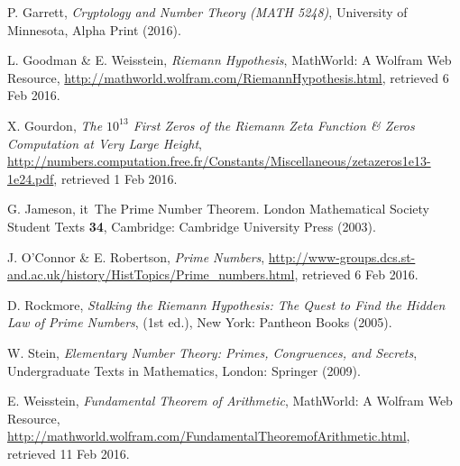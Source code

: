 \documentclass[11pt]{article}
\begin{document}
\medskip
\noindent
[Garrett 2016] P. Garrett, {\it Cryptology and Number Theory (MATH 5248)}, University of Minnesota, Alpha Print (2016).

\medskip
{} L. Goodman \& E. Weisstein, {\it Riemann Hypothesis}, MathWorld: A Wolfram Web Resource, \url{http://mathworld.wolfram.com/RiemannHypothesis.html}, retrieved 6 Feb 2016.


\medskip
\noindent
[Gourdon 2004] X. Gourdon, {\it The $10^{13}$ First Zeros of the Riemann Zeta Function \& Zeros Computation at Very Large Height}, \url{http://numbers.computation.free.fr/Constants/Miscellaneous/zetazeros1e13-1e24.pdf}, retrieved 1 Feb 2016.

\medskip
\noindent
[Jameson 2003] G. Jameson, {it\ The Prime Number Theorem}. London Mathematical Society Student Texts {\bf 34}, Cambridge: Cambridge University Press (2003).

\medskip
{} J. O'Connor \& E. Robertson, {\it Prime Numbers}, \url{http://www-groups.dcs.st-and.ac.uk/history/HistTopics/Prime_numbers.html}, retrieved 6 Feb 2016.

\medskip
\noindent
[Rockmore 2005] D. Rockmore, {\it Stalking the Riemann Hypothesis: The Quest to Find the Hidden Law of Prime Numbers}, (1st ed.), New York: Pantheon Books (2005).

\medskip
\noindent
[Stein 2009] W. Stein, {\it Elementary Number Theory: Primes, Congruences, and Secrets}, Undergraduate Texts in Mathematics, London: Springer (2009).

\medskip
\noindent
[Weisstein 2017] E. Weisstein, {\it Fundamental Theorem of Arithmetic}, MathWorld: A Wolfram Web Resource, \url{http://mathworld.wolfram.com/FundamentalTheoremofArithmetic.html}, retrieved 11 Feb 2016.
\end{document}
